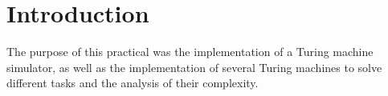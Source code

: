 \section{Introduction}

The purpose of this practical was the implementation of a Turing machine simulator, as well as the implementation of several Turing machines to solve different tasks and the analysis of their complexity.